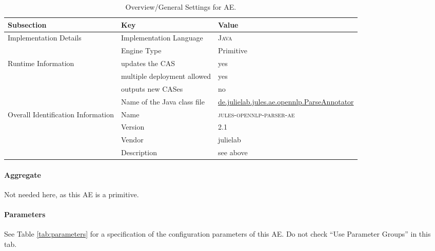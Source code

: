 \documentclass[11pt,a4paper,halfparskip]{scrartcl}
\begin{document}
\begin{table}[h!]
  \centering
  \begin{tabular}{|p{4cm}|p{4cm}|p{6cm}|}
    \hline
    Subsection & Key & Value \\
    \hline\hline
    Implementation Details & Implementation Language &  \textsc{Java} \\
    \cline{2-3}
    & Engine Type & Primitive\\
    \hline
    Runtime Information & updates the CAS & yes  \\
    \cline{2-3}
    & multiple deployment allowed & yes \\
    \cline{2-3}
    & outputs new CASes & no \\
    \cline{2-3}
    & Name of the Java class file & \url{de.julielab.jules.ae.opennlp.ParseAnnotator}\\
    \hline
    Overall Identification Information & Name & \textsc{jules-opennlp-parser-ae}
\\
    \cline{2-3}
    & Version & 2.1 \\
    \cline{2-3}
    & Vendor & julielab\\
    \cline{2-3}
    & Description & see above\\
    \hline
  \end{tabular}
  \caption{Overview/General Settings for AE.}
  \label{tab:overview}
\end{table}


\paragraph{Aggregate}
Not needed here, as this AE is a primitive.

\paragraph{Parameters}
\label{sss:parameters}

See Table \ref{tab:parameters} for a specification of the
configuration parameters of this AE. Do not check ``Use Parameter
Groups'' in this tab.
\end{document}
